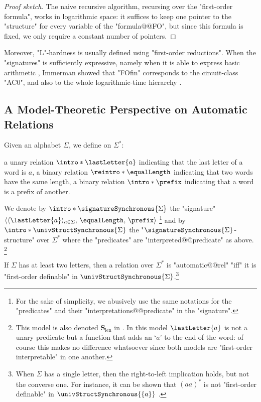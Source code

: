 \begin{proof}[Proof sketch]
	The naive recursive algorithm, recursing over the "first-order formula",
	works in logarithmic space: it suffices to keep one pointer to the "structure"
	for every variable of the "formula@@FO", but since this formula is fixed, we only
	require a constant number of pointers.
\end{proof}

Moreover, "L"-hardness is usually defined using "first-order reductions".
When the "signatures" is sufficiently expressive, namely when it is able to
express basic arithmetic \cite[Proviso~1.14]{Immerman1998DescriptiveComplexity},
Immerman showed that "FOfin" corresponds to the circuit-class "AC0",
and also to the whole logarithmic-time hierarchy
\cite[Corollary~5.32]{Immerman1998DescriptiveComplexity}.


\subsection{A Model-Theoretic Perspective on Automatic Relations}

Given an alphabet $\Sigma$, we define on $\Sigma^*$:
\begin{itemize}
	\itemAP a unary relation $\intro*\lastLetter{a}$ indicating that the last letter of a word is $a$,
	\itemAP a binary relation $\reintro*\equalLength$ indicating that two words have the same length,
	\itemAP a binary relation $\intro*\prefix$ indicating that a word is a prefix of another.
\end{itemize} 
We denote by $\intro*\signatureSynchronous{\Sigma}$ the "signature" $\langle \langle\lastLetter{a}\rangle_{a \in \Sigma},\, \equalLength,\, \prefix \rangle$%
\footnote{For the sake of simplicity, we abusively use the same notations for
the "predicates" and their "interpretations@@predicate" in the "signature".} and
by \AP$\intro*\univStructSynchronous{\Sigma}$ the "$\signatureSynchronous{\Sigma}$-structure"
over $\Sigma^*$ where the "predicates" are "interpreted@@predicate" as above.%
\footnote{This model is also denoted $\symbf{S}_{\mathrm{len}}$ in \cite{BenediktLibkinSchwentickSegoufin2003DefinableRelations}. In this model $\lastLetter{a}$ is
not a unary predicate but a function that adds an `$a$' to the end of the word: of course this
makes no difference whatsoever since both models are "first-order interpretable" in one another.}

\begin{proposition}
	\AP\label{prop:automatic-first-order}
	If $\Sigma$ has at least two letters, then a relation over $\Sigma^*$
	is "automatic@@rel" "iff" it is "first-order definable" in
	$\univStructSynchronous{\Sigma}$.\footnote{When $\Sigma$ has a single letter,
	then the right-to-left implication holds, but not the converse one.
	For instance, it can be shown that $(aa)^*$ is not "first-order definable"
	in $\univStructSynchronous{\{a\}}$ \cite[\S~9]{EilenbergElgotShepherdson1969TapeAutomata}.}
\end{proposition}

